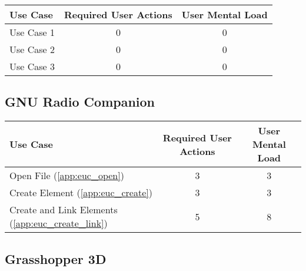 \begin{tabularx}{\textwidth}{Xcc}
\textbf{Use Case} & \textbf{Required User Actions} & \textbf{User Mental Load}\\
\hline
Use Case 1 & {\color{red}0} & {\color{red}0} \\
Use Case 2 & {\color{red}0} & {\color{red}0} \\
Use Case 3 & {\color{red}0} & {\color{red}0}
\end{tabularx}

\subsection*{GNU Radio Companion}




\begin{tabularx}{\textwidth}{Xcc}
\textbf{Use Case} & \textbf{Required User Actions} & \textbf{User Mental Load}\\
\hline
Open File (\ref{app:euc_open})                       & 3 & 3 \\
Create Element (\ref{app:euc_create})                & 3 & 3 \\
Create and Link Elements (\ref{app:euc_create_link}) & 5 & 8
\end{tabularx}

\subsection*{Grasshopper 3D}

